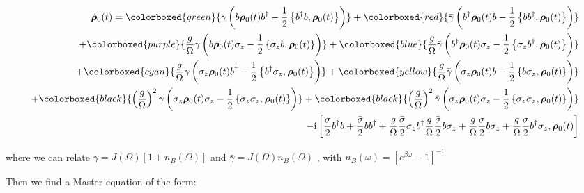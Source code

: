 \documentclass[%
preprint,
onecolumn,
notitlepag,
 amsmath,amssymb,
 aps,
 pra,
]{revtex4-2}
\begin{document}
\begin{equation}
\begin{aligned}
\dot{\boldsymbol{\rho}}_0(t) =  \colorboxed{green}{ \gamma\left(b \boldsymbol{\rho}_{\mathrm{0}}(t) b^{\dagger}-\frac{1}{2}\left\{b^{\dagger} b, \boldsymbol{\rho}_{\mathrm{0}}(t)\right\}\right) } +  \colorboxed{red}{ \bar{\gamma}\left(b^{\dagger}\boldsymbol{\rho}_{\mathrm{0}}(t) b-\frac{1}{2}\left\{b b^{\dagger}, \boldsymbol{\rho}_{\mathrm{0}}(t) \right\}\right)} \\
+ \colorboxed{purple}{ \frac{g}{\Omega} \gamma\left(b \boldsymbol{\rho}_{\mathrm{0}}(t) \sigma_z-\frac{1}{2}\left\{\sigma_z b, \boldsymbol{\rho}_{\mathrm{0}}(t)\right\}\right)}  + \colorboxed{blue}{ \frac{g}{\Omega}  \bar{\gamma}\left(b^{\dagger}\boldsymbol{\rho}_{\mathrm{0}}(t) \sigma_z  -\frac{1}{2}\left\{ \sigma_z b^{\dagger}, \boldsymbol{\rho}_{\mathrm{0}}(t) \right\}\right) }  \\
+  \colorboxed{cyan}{ \frac{g}{\Omega} \gamma\left( \sigma_z  \boldsymbol{\rho}_{\mathrm{0}}(t) b^{\dagger}-\frac{1}{2}\left\{b^{\dagger} \sigma_z , \boldsymbol{\rho}_{\mathrm{0}}(t)\right\}\right) } + \colorboxed{yellow}{ \frac{g}{\Omega}  \bar{\gamma}\left(\sigma_z  \boldsymbol{\rho}_{\mathrm{0}}(t) b-\frac{1}{2}\left\{b \sigma_z , \boldsymbol{\rho}_{\mathrm{0}}(t) \right\}\right) } \\
+  \colorboxed{black}{\left(\frac{g}{\Omega} \right)^2 \gamma\left( \sigma_z  \boldsymbol{\rho}_{\mathrm{0}}(t) \sigma_z -\frac{1}{2}\left\{\sigma_z \sigma_z , \boldsymbol{\rho}_{\mathrm{0}}(t)\right\}\right) } + \colorboxed{black}{ \left(\frac{g}{\Omega} \right)^2  \bar{\gamma}\left(\sigma_z  \boldsymbol{\rho}_{\mathrm{0}}(t) \sigma_z-\frac{1}{2}\left\{\sigma_z  \sigma_z , \boldsymbol{\rho}_{\mathrm{0}}(t) \right\}\right) } \\
-\mathrm{i}\left[\frac{\sigma}{2} b^{\dagger} b+\frac{\bar{\sigma}}{2} b b^{\dagger} + \frac{g}{\Omega} \frac{\bar{\sigma}}{2} \sigma_z b^{\dagger} \frac{g}{\Omega} \frac{\bar{\sigma}}{2}  b \sigma_z  +\frac{g}{\Omega} \frac{\sigma}{2} b \sigma_z  + \frac{g}{\Omega} \frac{\sigma}{2}  b^{\dagger} \sigma_z  , \boldsymbol{\rho}_{\mathrm{0}}(t) \right]
\end{aligned}
\end{equation}

where we can relate $\gamma=J(\Omega)\left[1+n_{B}(\Omega)\right] $ and $ \bar{\gamma} = J(\Omega) n_{B}(\Omega)$  , with   $n_{B}(\omega)=\left[e^{\beta \omega}-1\right]^{-1}$

Then we find a Master equation of the form: 
\end{document}
